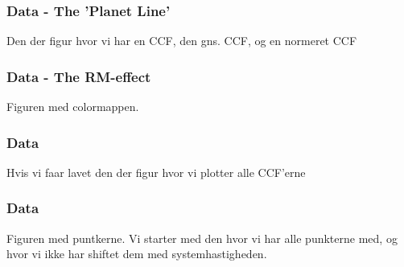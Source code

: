 \documentclass[show notes]{beamer}
\begin{document}
\begin{frame}
\frametitle{Data - The 'Planet Line'}
Den der figur hvor vi har en CCF, den gns. CCF, og en normeret CCF

\end{frame}

\begin{frame}
\frametitle{Data - The RM-effect}
Figuren med colormappen.

\end{frame}

\begin{frame}
\frametitle{Data}
Hvis vi faar lavet den der figur hvor vi plotter alle CCF'erne

\end{frame}

\begin{frame}
\frametitle{Data}
Figuren med puntkerne. Vi starter med den hvor vi har alle punkterne med, og hvor vi ikke har shiftet dem med systemhastigheden.

\end{frame}
\end{document}
